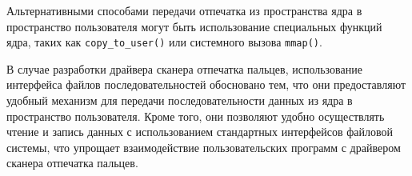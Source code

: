 Альтернативными способами передачи отпечатка из пространства ядра в пространство пользователя могут быть использование специальных функций ядра, таких как \texttt{copy\_to\_user()} или системного вызова \texttt{mmap()}.

\clearpage

В случае разработки драйвера сканера отпечатка пальцев, использование интерфейса файлов последовательностей обосновано тем, что они предоставляют удобный механизм для передачи последовательности данных из ядра в пространство пользователя. Кроме того, они позволяют удобно осуществлять чтение и запись данных с использованием стандартных интерфейсов файловой системы, что упрощает взаимодействие пользовательских программ с драйвером сканера отпечатка пальцев.

\clearpage
